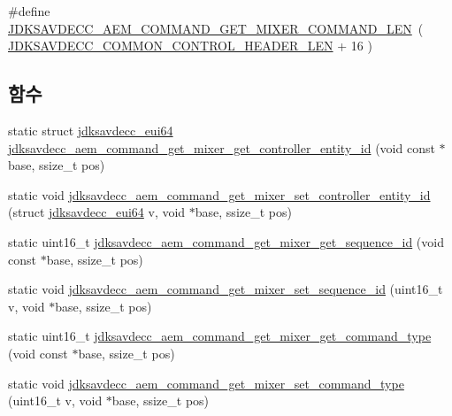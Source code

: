 \begin{DoxyCompactItemize}
\item 
\#define \hyperlink{group__command__get__mixer_gaa8242449700246096e957232cf625ed3}{J\+D\+K\+S\+A\+V\+D\+E\+C\+C\+\_\+\+A\+E\+M\+\_\+\+C\+O\+M\+M\+A\+N\+D\+\_\+\+G\+E\+T\+\_\+\+M\+I\+X\+E\+R\+\_\+\+C\+O\+M\+M\+A\+N\+D\+\_\+\+L\+EN}~( \hyperlink{group__jdksavdecc__avtp__common__control__header_gaae84052886fb1bb42f3bc5f85b741dff}{J\+D\+K\+S\+A\+V\+D\+E\+C\+C\+\_\+\+C\+O\+M\+M\+O\+N\+\_\+\+C\+O\+N\+T\+R\+O\+L\+\_\+\+H\+E\+A\+D\+E\+R\+\_\+\+L\+EN} + 16 )
\end{DoxyCompactItemize}
\subsection*{함수}
\begin{DoxyCompactItemize}
\item 
static struct \hyperlink{structjdksavdecc__eui64}{jdksavdecc\+\_\+eui64} \hyperlink{group__command__get__mixer_gaddd42c7e515ee1e644a193d75578bcd8}{jdksavdecc\+\_\+aem\+\_\+command\+\_\+get\+\_\+mixer\+\_\+get\+\_\+controller\+\_\+entity\+\_\+id} (void const $\ast$base, ssize\+\_\+t pos)
\item 
static void \hyperlink{group__command__get__mixer_gab241ed420406450375caf40cd7c8e351}{jdksavdecc\+\_\+aem\+\_\+command\+\_\+get\+\_\+mixer\+\_\+set\+\_\+controller\+\_\+entity\+\_\+id} (struct \hyperlink{structjdksavdecc__eui64}{jdksavdecc\+\_\+eui64} v, void $\ast$base, ssize\+\_\+t pos)
\item 
static uint16\+\_\+t \hyperlink{group__command__get__mixer_ga1773aa4d49b6049e45a99690d4653c9a}{jdksavdecc\+\_\+aem\+\_\+command\+\_\+get\+\_\+mixer\+\_\+get\+\_\+sequence\+\_\+id} (void const $\ast$base, ssize\+\_\+t pos)
\item 
static void \hyperlink{group__command__get__mixer_ga5133e34fc1f6d848deae74eea3ffab05}{jdksavdecc\+\_\+aem\+\_\+command\+\_\+get\+\_\+mixer\+\_\+set\+\_\+sequence\+\_\+id} (uint16\+\_\+t v, void $\ast$base, ssize\+\_\+t pos)
\item 
static uint16\+\_\+t \hyperlink{group__command__get__mixer_ga025621cdd25992ed588f50195965886d}{jdksavdecc\+\_\+aem\+\_\+command\+\_\+get\+\_\+mixer\+\_\+get\+\_\+command\+\_\+type} (void const $\ast$base, ssize\+\_\+t pos)
\item 
static void \hyperlink{group__command__get__mixer_gac8c2bbf3ab70b0cce6f2eced7cd8076c}{jdksavdecc\+\_\+aem\+\_\+command\+\_\+get\+\_\+mixer\+\_\+set\+\_\+command\+\_\+type} (uint16\+\_\+t v, void $\ast$base, ssize\+\_\+t pos)
\item 

\end{DoxyCompactItemize}
